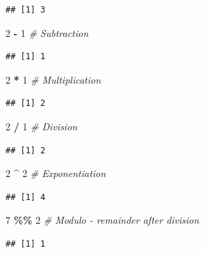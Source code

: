 \documentclass[
]{article}
\newenvironment{Shaded}{\begin{snugshade}}{\end{snugshade}}
\newcommand{\CommentTok}[1]{\textcolor[rgb]{0.56,0.35,0.01}{\textit{#1}}}
\newcommand{\DecValTok}[1]{\textcolor[rgb]{0.00,0.00,0.81}{#1}}
\newcommand{\SpecialCharTok}[1]{\textcolor[rgb]{0.81,0.36,0.00}{\textbf{#1}}}
\begin{document}
\begin{verbatim}
## [1] 3
\end{verbatim}

\begin{Shaded}
\begin{Highlighting}[]
\DecValTok{2} \SpecialCharTok{{-}} \DecValTok{1}   \CommentTok{\# Subtraction }
\end{Highlighting}
\end{Shaded}

\begin{verbatim}
## [1] 1
\end{verbatim}

\begin{Shaded}
\begin{Highlighting}[]
\DecValTok{2} \SpecialCharTok{*} \DecValTok{1}   \CommentTok{\# Multiplication}
\end{Highlighting}
\end{Shaded}

\begin{verbatim}
## [1] 2
\end{verbatim}

\begin{Shaded}
\begin{Highlighting}[]
\DecValTok{2} \SpecialCharTok{/} \DecValTok{1}   \CommentTok{\# Division}
\end{Highlighting}
\end{Shaded}

\begin{verbatim}
## [1] 2
\end{verbatim}

\begin{Shaded}
\begin{Highlighting}[]
\DecValTok{2} \SpecialCharTok{\^{}} \DecValTok{2}   \CommentTok{\# Exponentiation}
\end{Highlighting}
\end{Shaded}

\begin{verbatim}
## [1] 4
\end{verbatim}

\begin{Shaded}
\begin{Highlighting}[]
\DecValTok{7} \SpecialCharTok{\%\%} \DecValTok{2}  \CommentTok{\# Modulo {-} remainder after division}
\end{Highlighting}
\end{Shaded}

\begin{verbatim}
## [1] 1
\end{verbatim}
\end{document}
